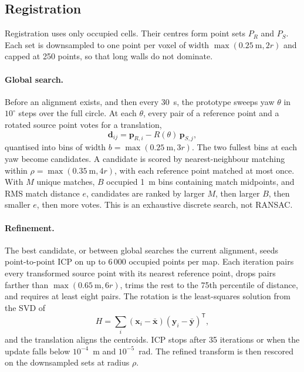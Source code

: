 \subsection{Registration}

Registration uses only occupied cells.
Their centres form point sets $P_R$ and $P_S$.
Each set is downsampled to one point per voxel of width $\max(0.25~\text{m}, 2r)$ and capped at 250 points, so that long walls do not dominate.

\paragraph{Global search.}
Before an alignment exists, and then every 30~s, the prototype sweeps yaw $\theta$ in $10^\circ$ steps over the full circle.
At each $\theta$, every pair of a reference point and a rotated source point votes for a translation,
\begin{equation}
  \mathbf{d}_{ij} = \mathbf{p}_{R,i} - R(\theta)\,\mathbf{p}_{S,j},
\end{equation}
quantised into bins of width $b = \max(0.25~\text{m}, 3r)$.
The two fullest bins at each yaw become candidates.
A candidate is scored by nearest-neighbour matching within $\rho = \max(0.35~\text{m}, 4r)$, with each reference point matched at most once.
With $M$ unique matches, $B$ occupied 1~m bins containing match midpoints, and RMS match distance $e$, candidates are ranked by larger $M$, then larger $B$, then smaller $e$, then more votes.
This is an exhaustive discrete search, not RANSAC.

\paragraph{Refinement.}
The best candidate, or between global searches the current alignment, seeds point-to-point ICP on up to 6\,000 occupied points per map.
Each iteration pairs every transformed source point with its nearest reference point, drops pairs farther than $\max(0.65~\text{m}, 6r)$, trims the rest to the 75th percentile of distance, and requires at least eight pairs.
The rotation is the least-squares solution from the SVD of
\begin{equation}
  H = \sum_i (\mathbf{x}_i - \bar{\mathbf{x}})(\mathbf{y}_i - \bar{\mathbf{y}})^{\mathsf{T}},
\end{equation}
and the translation aligns the centroids.
ICP stops after 35 iterations or when the update falls below $10^{-4}$~m and $10^{-5}$~rad.
The refined transform is then rescored on the downsampled sets at radius $\rho$.

